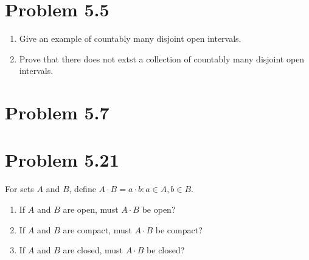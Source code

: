 \documentclass[12pt]{report}
\begin{document}
\section{Problem 5.5}
    \begin{enumerate}[label=(\alph*)]
        \item   Give an example of countably many disjoint open intervals.
        \item   Prove that there does not extst a collection of countably many disjoint open intervals.
    \end{enumerate}

\section{Problem 5.7}

\pagebreak

\section{Problem 5.21}
    For sets $A$ and $B$, define $A \cdot B = {a \cdot b: a \in A, b \in B}$.  
    \begin{enumerate}[label=(\alph*)]
        \item   If $A$ and $B$ are open, must $A \cdot B$ be open?
        \item   If $A$ and $B$ are compact, must $A \cdot B$ be compact?
        \item   If $A$ and $B$ are closed, must $A \cdot B$ be closed?
    \end{enumerate}
\end{document}
